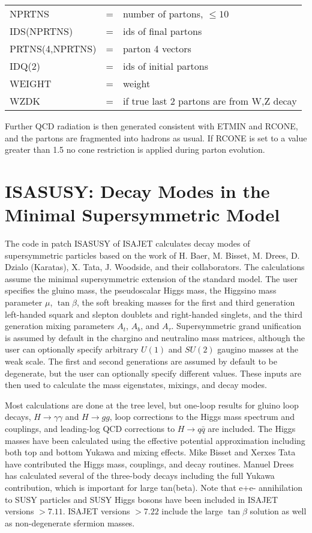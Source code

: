 \smallskip\noindent
\begin{tabular}{lcl}
       NPRTNS          &=& number of partons, $\le10$\\
       IDS(NPRTNS)     &=& ids of final partons\\
       PRTNS(4,NPRTNS) &=& parton 4 vectors\\
       IDQ(2)          &=& ids of initial partons\\
       WEIGHT          &=& weight\\
       WZDK            &=& if true last 2 partons are from W,Z decay\\
\end{tabular}
\smallskip

      Further QCD radiation is then generated consistent with
ETMIN and RCONE, and the partons are fragmented into hadrons as usual.
If RCONE is set to a value greater than 1.5 no cone restriction is
applied during parton evolution.
\newpage
\section{ISASUSY: Decay Modes in the Minimal Supersymmetric
Model\label{SUSY}}

      The code in patch ISASUSY of ISAJET calculates decay modes of
supersymmetric particles based on the work of H. Baer, M. Bisset, M.
Drees, D. Dzialo (Karatas), X. Tata, J. Woodside, and their
collaborators. The calculations assume the minimal supersymmetric
extension of the standard model. The user specifies the gluino mass,
the pseudoscalar Higgs mass, the Higgsino mass parameter $\mu$,
$\tan\beta$, the soft breaking masses for the first and third
generation left-handed squark and slepton doublets and right-handed
singlets, and the third generation mixing parameters $A_t$, $A_b$, and
$A_\tau$.  Supersymmetric grand unification is assumed by default in
the chargino and neutralino mass matrices, although the user can
optionally specify arbitrary $U(1)$ and $SU(2)$ gaugino masses at the
weak scale. The first and second generations are assumed by default to
be degenerate, but the user can optionally specify different values.
These inputs are then used to calculate the mass eigenstates, mixings,
and decay modes.

      Most calculations are done at the tree level, but one-loop
results for gluino loop decays, $H \to \gamma\gamma$ and $H \to gg$, loop
corrections to the Higgs mass spectrum and couplings, and leading-log
QCD corrections to $H \to q \bar q$ are included. The Higgs masses have
been calculated using the effective potential approximation including
both top and bottom Yukawa and mixing effects. Mike Bisset and Xerxes
Tata have contributed the Higgs mass, couplings, and decay routines.
Manuel Drees has calculated several of the three-body decays including
the full Yukawa contribution, which is important for large tan(beta).
Note that e+e- annihilation to SUSY particles and SUSY Higgs bosons
have been included in ISAJET versions $>7.11$. ISAJET versions $>7.22$
include the large $\tan\beta$ solution as well as non-degenerate
sfermion masses.

